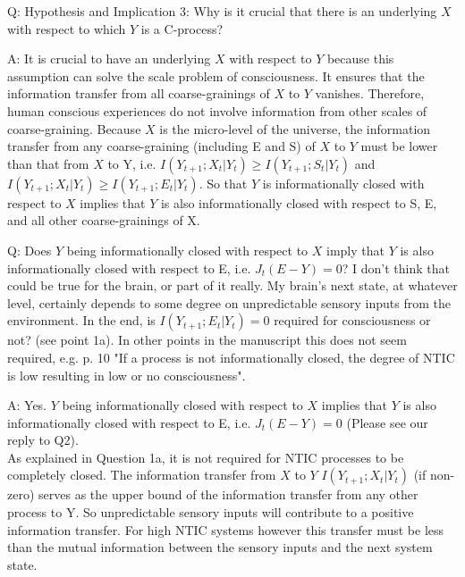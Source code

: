 \documentclass[utf8]{article}
\newcounter{cQuestion}[section]
\newenvironment{question}
    {\refstepcounter{cQuestion}\color{Blue}\noindent\newline Q\thecQuestion:}
    {~\newline}
\newenvironment{ans}  
    {\color{Black}\noindent A:}
    {~\newline}
\begin{document}
       
        
        \begin{question}
            Hypothesis and Implication 3: Why is it crucial that there is an underlying $X$ with respect to which $Y$ is a C-process?     
        \end{question}
        
        \begin{ans}        	
            It is crucial to have an underlying $X$ with respect to $Y$ because this assumption can solve the scale problem of consciousness. It ensures that the information transfer from all coarse-grainings of $X$ to $Y$ vanishes. Therefore, human conscious experiences do not involve information from other scales of coarse-graining. 
            Because $X$ is the micro-level of the universe, the information transfer from any coarse-graining (including E and S) of $X$  to $Y$ must be lower than that from $X$ to Y, i.e. $I(Y_{t+1}; X_t|Y_t) \geq I(Y_{t+1}; S_t|Y_t)$ and $I(Y_{t+1}; X_t|Y_t) \geq I(Y_{t+1}; E_t|Y_t)$. So that $Y$ is informationally closed with respect to $X$ implies that $Y$ is also informationally closed with respect to S, E, and all other coarse-grainings of X.
        \end{ans}
        
        \begin{question}
            Does $Y$ being informationally closed with respect to $X$ imply that $Y$ is also informationally closed with respect to E, i.e. $J_t(E-Y) = 0$? I don't think that could be true for the brain, or part of it really. My brain's next state, at whatever level, certainly depends to some degree on unpredictable sensory inputs from the environment. In the end, is $I(Y_{t+1}; E_t|Y_t) = 0$ required for consciousness or not? (see point 1a). In other points in the manuscript this does not seem required, e.g. p. 10 "If a process is not informationally closed, the degree of NTIC is low resulting in low or no consciousness".    
        \end{question}
        
        \begin{ans}
            Yes. $Y$ being informationally closed with respect to $X$ implies that $Y$ is also informationally closed with respect to E, i.e. $J_t(E-Y) = 0$ (Please see our reply to Q2).\\
            As explained in Question 1a, it is not required for NTIC processes to be completely closed. The information transfer from $X$ to $Y$ $I(Y_{t+1}; X_t|Y_t)$ (if non-zero) serves as the upper bound of the information transfer from any other process to Y. So unpredictable sensory inputs will contribute to a positive information transfer. For high NTIC systems however this transfer must be less than the mutual information between the sensory inputs and the next system state.        
        \end{ans}
        
\end{document}
